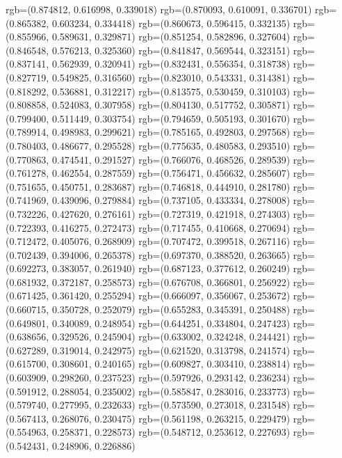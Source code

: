 {{{					rgb=(0.874812, 0.616998, 0.339018)
					rgb=(0.870093, 0.610091, 0.336701)
					rgb=(0.865382, 0.603234, 0.334418)
					rgb=(0.860673, 0.596415, 0.332135)
					rgb=(0.855966, 0.589631, 0.329871)
					rgb=(0.851254, 0.582896, 0.327604)
					rgb=(0.846548, 0.576213, 0.325360)
					rgb=(0.841847, 0.569544, 0.323151)
					rgb=(0.837141, 0.562939, 0.320941)
					rgb=(0.832431, 0.556354, 0.318738)
					rgb=(0.827719, 0.549825, 0.316560)
					rgb=(0.823010, 0.543331, 0.314381)
					rgb=(0.818292, 0.536881, 0.312217)
					rgb=(0.813575, 0.530459, 0.310103)
					rgb=(0.808858, 0.524083, 0.307958)
					rgb=(0.804130, 0.517752, 0.305871)
					rgb=(0.799400, 0.511449, 0.303754)
					rgb=(0.794659, 0.505193, 0.301670)
					rgb=(0.789914, 0.498983, 0.299621)
					rgb=(0.785165, 0.492803, 0.297568)
					rgb=(0.780403, 0.486677, 0.295528)
					rgb=(0.775635, 0.480583, 0.293510)
					rgb=(0.770863, 0.474541, 0.291527)
					rgb=(0.766076, 0.468526, 0.289539)
					rgb=(0.761278, 0.462554, 0.287559)
					rgb=(0.756471, 0.456632, 0.285607)
					rgb=(0.751655, 0.450751, 0.283687)
					rgb=(0.746818, 0.444910, 0.281780)
					rgb=(0.741969, 0.439096, 0.279884)
					rgb=(0.737105, 0.433334, 0.278008)
					rgb=(0.732226, 0.427620, 0.276161)
					rgb=(0.727319, 0.421918, 0.274303)
					rgb=(0.722393, 0.416275, 0.272473)
					rgb=(0.717455, 0.410668, 0.270694)
					rgb=(0.712472, 0.405076, 0.268909)
					rgb=(0.707472, 0.399518, 0.267116)
					rgb=(0.702439, 0.394006, 0.265378)
					rgb=(0.697370, 0.388520, 0.263665)
					rgb=(0.692273, 0.383057, 0.261940)
					rgb=(0.687123, 0.377612, 0.260249)
					rgb=(0.681932, 0.372187, 0.258573)
					rgb=(0.676708, 0.366801, 0.256922)
					rgb=(0.671425, 0.361420, 0.255294)
					rgb=(0.666097, 0.356067, 0.253672)
					rgb=(0.660715, 0.350728, 0.252079)
					rgb=(0.655283, 0.345391, 0.250488)
					rgb=(0.649801, 0.340089, 0.248954)
					rgb=(0.644251, 0.334804, 0.247423)
					rgb=(0.638656, 0.329526, 0.245904)
					rgb=(0.633002, 0.324248, 0.244421)
					rgb=(0.627289, 0.319014, 0.242975)
					rgb=(0.621520, 0.313798, 0.241574)
					rgb=(0.615700, 0.308601, 0.240165)
					rgb=(0.609827, 0.303410, 0.238814)
					rgb=(0.603909, 0.298260, 0.237523)
					rgb=(0.597926, 0.293142, 0.236234)
					rgb=(0.591912, 0.288054, 0.235002)
					rgb=(0.585847, 0.283016, 0.233773)
					rgb=(0.579740, 0.277995, 0.232633)
					rgb=(0.573590, 0.273018, 0.231548)
					rgb=(0.567413, 0.268076, 0.230475)
					rgb=(0.561198, 0.263215, 0.229479)
					rgb=(0.554963, 0.258371, 0.228573)
					rgb=(0.548712, 0.253612, 0.227693)
					rgb=(0.542431, 0.248906, 0.226886)
}}}
